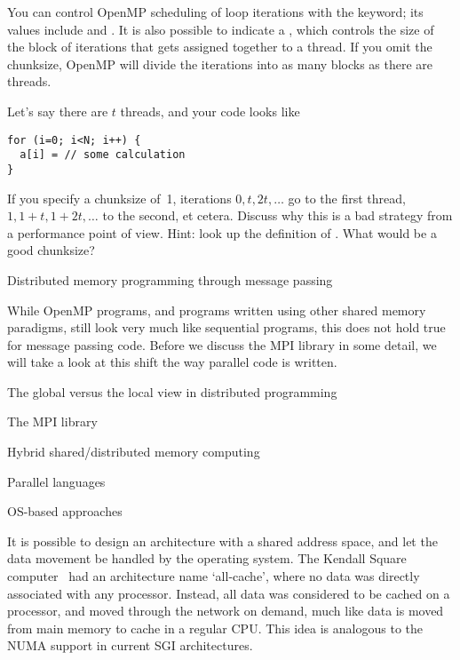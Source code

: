 You can control OpenMP scheduling of loop iterations with the 
keyword; its values include  and . It is also possible 
to indicate a , which controls the size of the block of 
iterations that gets assigned together to a thread. If you omit the chunksize,
OpenMP will divide the iterations into as many blocks as there are threads.

\begin{exercise}
Let's say there are $t$ threads, and your code looks like
\lstset{language=C}
\begin{lstlisting}
for (i=0; i<N; i++) {
  a[i] = // some calculation
}
\end{lstlisting}
If you specify a chunksize of~1,
iterations $0,t,2t,\ldots$ go to the first thread,
$1,1+t,1+2t,\ldots$ to the second, et cetera. Discuss why this is a bad
strategy from a performance point of view. Hint: look up the definition of
. What would be a good chunksize?
\end{exercise}


 {Distributed memory programming through message passing}

While OpenMP programs, and programs written using other shared memory
paradigms, still look very much like sequential programs, this does
not hold true for message passing code. Before we discuss the \acf{MPI}
library in some detail, we will take a look at this shift the way
parallel code is written.

 {The global versus the local view in distributed programming}
\label{sec:distributed-programming}


 {The MPI library}
\label{sec:mpi}


 {Hybrid shared/distributed memory computing}
\label{sec:hybrid}


 {Parallel languages}
\label{sec:pgas}


 {OS-based approaches}

It is possible to design an architecture with a shared address space,
and let the data movement be handled by the operating system. The
Kendall Square computer~\cite{KSRallcache} had an architecture name
`all-cache', where no data was directly associated with any
processor. Instead, all data was considered to be cached on a
processor, and moved through the network on demand, much like data is
moved from main memory to cache in a regular CPU. This idea 
is analogous to the \ac{NUMA} support in current SGI architectures.

